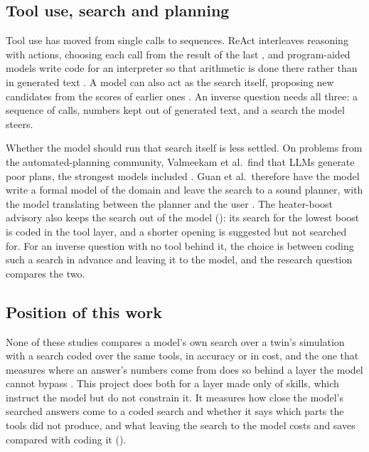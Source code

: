   \subsection{Tool use, search and planning}
  \label{sec:related-tools}

  Tool use has moved from single calls to sequences. ReAct interleaves reasoning with actions,
  choosing each call from the result of the last \cite{yao2023react}, and program-aided models
  write code for an interpreter so that arithmetic is done there rather than in generated text
  \cite{gao2023pal}. A model can also act as the search itself, proposing new candidates from the
  scores of earlier ones \cite{yang2024opro}. An inverse question needs all three: a sequence of
  calls, numbers kept out of generated text, and a search the model steers.

  Whether the model should run that search itself is less settled. On problems from the
  automated-planning community, Valmeekam et al.\ find that LLMs generate poor plans,
  the strongest models included \cite{valmeekam2023planbench}. Guan et al.\ therefore have the
  model write a formal model of the domain and leave the search to a sound planner, with the model
  translating between the planner and the user \cite{guan2023worldmodels}. The heater-boost
  advisory also keeps the search out of the model (): its search for the lowest
  boost is coded in the tool layer, and a shorter opening is suggested but not searched for. For an inverse question with
  no tool behind it, the choice is between coding such a search in advance and leaving it to the
  model, and the research question compares the two.

  \subsection{Position of this work}
  \label{sec:related-position}

  None of these studies compares a model's own search over a twin's simulation with a search coded
  over the same tools, in accuracy or in cost, and the one that measures where an answer's numbers
  come from does so behind a layer the model cannot bypass \cite{mylonas2026governance}. This project does both for a layer
  made only of skills, which instruct the model but do not constrain it. It measures how close the
  model's searched answers come to a coded search and whether it says which parts the tools did not
  produce, and what leaving the search to the model costs and saves compared with coding it
  ().
